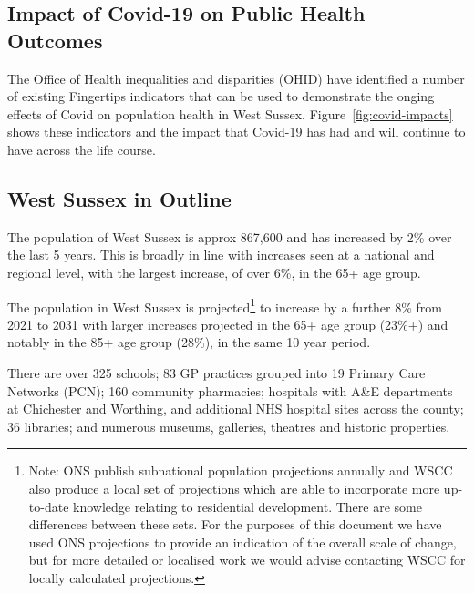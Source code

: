 
\subsection{Impact of Covid-19 on Public Health Outcomes}
The Office of Health inequalities and disparities (OHID) have identified a number of existing Fingertips indicators that can be used to demonstrate the onging effects of Covid on population health in West Sussex. Figure~\ref{fig:covid-impacts} shows these indicators and the impact that Covid-19 has had and will continue to have across the life course.





\subsection{West Sussex in Outline} %
The population of West Sussex is approx 867,600 and has increased by 2\% over the last 5 years. This is broadly in line with increases seen at a national and regional level, with the largest increase, of over 6\%, in the 65+ age group.

The population in West Sussex is projected\footnote{Note: ONS publish subnational population projections annually and WSCC also produce a local set of projections which are able to incorporate more up-to-date knowledge relating to residential development. There are some differences between these sets. For the purposes of this document we have used ONS projections to provide an indication of the overall scale of change, but for more detailed or localised work we would advise contacting WSCC for locally calculated projections.} to increase by a further 8\% from 2021 to 2031 with larger increases projected in the 65+ age group (23\%+) and notably in the 85+ age group (28\%), in the same 10 year period.

There are over 325 schools; 83 GP practices grouped into 19 Primary Care Networks (PCN); 160 community pharmacies; hospitals with A\&E departments at Chichester and Worthing, and additional NHS hospital sites across the county; 36 libraries; and numerous museums, galleries, theatres and historic properties.


